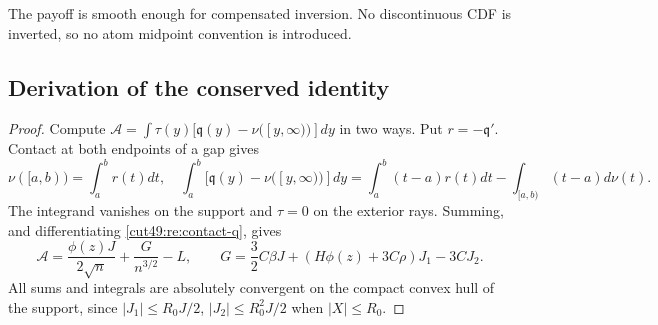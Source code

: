 \documentclass[11pt,a4paper]{article}
\numberwithin{equation}{section}
\theoremstyle{definition}
\theoremstyle{remark}
\begin{document}
The payoff is smooth enough for compensated inversion. No discontinuous
CDF is inverted, so no atom midpoint convention is introduced.
\subsection{Derivation of the conserved identity}
\begin{proof}
Compute $\mathcal A=\int\tau(y)[\mathfrak q(y)-\nu([y,\infty))]dy$
in two ways. Put $r=-\mathfrak q'$. Contact at both endpoints of a gap gives
\[
 \nu([a,b))=\int_a^b r(t)dt,
 \quad
 \int_a^b[\mathfrak q(y)-\nu([y,\infty))]dy
 =\int_a^b(t-a)r(t)dt-\int_{[a,b)}(t-a)d\nu(t).
\]
The integrand vanishes on the support and $\tau=0$ on the exterior rays.
Summing, and differentiating \eqref{cut49:re:contact-q}, gives
\begin{equation}\label{cut49:smooth:A-gap}
 \mathcal A=\frac{\phi(z)J}{2\sqrt n}+\frac{G}{n^{3/2}}-L,
 \qquad
 G=\frac32C\beta J+(H\phi(z)+3C\rho)J_1-3CJ_2.
\end{equation}
All sums and integrals are absolutely convergent on the compact convex
hull of the support, since $|J_1|\le R_0J/2$, $|J_2|\le R_0^2J/2$
when $|X|\le R_0$.


\end{proof}
\end{document}
